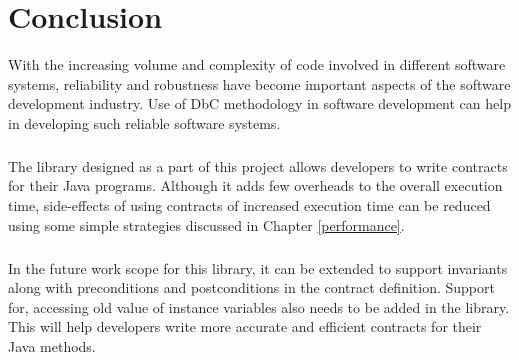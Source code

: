 \chapter{Conclusion}

With the increasing volume and complexity of code involved in different software systems, reliability and robustness have become important aspects of the software development industry. Use of DbC methodology in software development can help in developing such reliable software systems. 
\paragraph{}
The library designed as a part of this project allows developers to write contracts for their Java programs. Although it adds few overheads to the overall execution time, side-effects of using contracts of increased execution time can be reduced using some simple strategies discussed in Chapter \ref{performance}.
\paragraph{}
In the future work scope for this library, it can be extended to support invariants along with preconditions and postconditions in the contract definition. Support for, accessing old value of instance variables also needs to be added in the library. This will help developers write more accurate and efficient contracts for their Java methods. 
